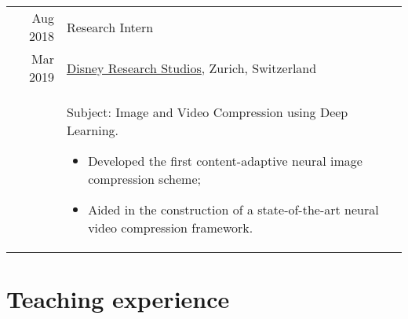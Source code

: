 \documentclass[a4paper,11pt]{article}
\def\datespace{-2pt}
\def\title-main-sep{4pt}
\def\tabwidth{13cm}
\newcommand{\optExtraSpace}{}
\newcommand{\optExtraSpace}{\vspace{5pt}}
\begin{document}
\begin{tabular}{r|p{\tabwidth}}
      {\small Aug 2018} & Research Intern \\[\datespace]
      {\small Mar 2019} &  {\small \href{https://studios.disneyresearch.com/}{Disney Research Studios}, Zurich, Switzerland}\\[\title-main-sep]
			& {
        \parbox[t]{\tabwidth}{
        \footnotesize Subject: Image and Video Compression using Deep Learning.
        \begin{itemize}[topsep=0pt, partopsep=0pt, parsep=0pt, itemsep=0pt, leftmargin=*, after=\vspace{0pt}]
          \item Developed the first content-adaptive neural image compression scheme;
          \item Aided in the construction of a state-of-the-art neural video compression framework.
        \end{itemize}
        }
      }
    \end{tabular}

  

  \vspace{15pt}
  \optExtraSpace

  \section{Teaching experience}
\end{document}
